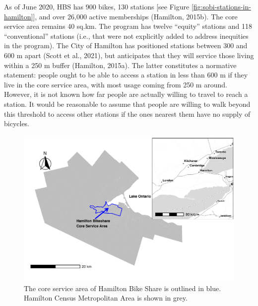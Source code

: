 \documentclass[]{elsarticle} %
\begin{document}
As of June 2020, HBS has 900 bikes, 130 stations {[}see Figure
\ref{fig:sobi-stations-in-hamilton}{]}, and over 26,000 active
memberships (Hamilton, 2015b). The core service area remains 40 sq.km.
The program has twelve ``equity'' stations and 118 ``conventional''
stations (i.e., that were not explicitly added to address inequities in
the program). The City of Hamilton has positioned stations between 300
and 600 m apart (Scott et al., 2021), but anticipates that they will
service those living within a 250 m buffer (Hamilton, 2015a). The latter
constitutes a normative statement: people ought to be able to access a
station in less than 600 m if they live in the core service area, with
most usage coming from 250 m around. However, it is not known how far
people are actually willing to travel to reach a station. It would be
reasonable to assume that people are willing to walk beyond this
threshold to access other stations if the ones nearest them have no
supply of bicycles.

\begin{figure}

{\centering \includegraphics[width=0.9\linewidth]{Bike-share-spatial-equity-R1_files/figure-latex/hamilton-and-sobi-service-area-1} 

}

\caption{The core service area of Hamilton Bike Share is outlined in blue. Hamilton Census Metropolitan Area is shown in grey.}\label{fig:hamilton-and-sobi-service-area}
\end{figure}
\end{document}
